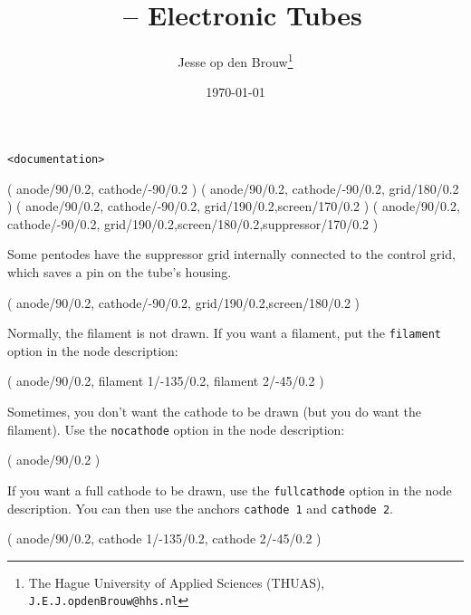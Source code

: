 \documentclass[a4paper]{article}
\author{Jesse op den Brouw\thanks{The Hague University of Applied Sciences (THUAS), \texttt{J.E.J.opdenBrouw@hhs.nl}}}
\title{\Circuitikz\ -- Electronic Tubes}
\date{\today}
\begin{document}

\begin{lstlisting}[numbers=none,xleftmargin=0pt]
<documentation>
\end{lstlisting}

\begin{groupdesc}
	 ( anode/90/0.2, cathode/-90/0.2 )
	 ( anode/90/0.2, cathode/-90/0.2, grid/180/0.2 )
	 ( anode/90/0.2, cathode/-90/0.2, grid/190/0.2,screen/170/0.2 )
	 ( anode/90/0.2, cathode/-90/0.2, grid/190/0.2,screen/180/0.2,suppressor/170/0.2 )
\end{groupdesc}

Some pentodes have the suppressor grid internally connected to the control grid, which saves a pin on the tube's housing.

\begin{groupdesc}
	 ( anode/90/0.2, cathode/-90/0.2, grid/190/0.2,screen/180/0.2 )
\end{groupdesc}

Normally, the filament is not drawn. If you want a filament, put the \verb|filament| option in the node description:

\begin{groupdesc}
	 ( anode/90/0.2, filament 1/-135/0.2, filament 2/-45/0.2 )
\end{groupdesc}

Sometimes, you don't want the cathode to be drawn (but you do want the filament). Use the \verb|nocathode| option in the node description:

\begin{groupdesc}
	 ( anode/90/0.2 )
\end{groupdesc}

If you want a full cathode to be drawn, use the \verb|fullcathode| option in the node description. You can then use the anchors \verb|cathode 1| and \verb|cathode 2|.

\begin{groupdesc}
	 ( anode/90/0.2, cathode 1/-135/0.2, cathode 2/-45/0.2 )
\end{groupdesc}
\end{document}
